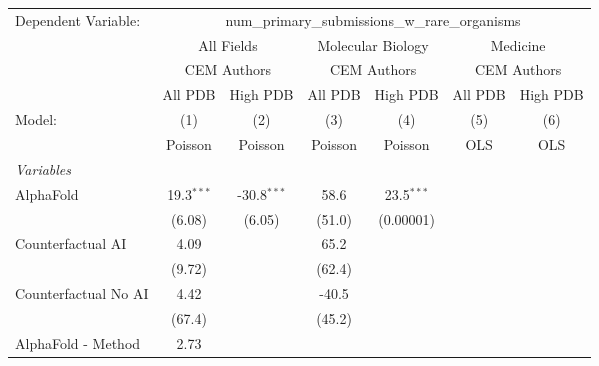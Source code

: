 \begingroup
\centering
\begin{tabular}{lcccccc}
   \tabularnewline \midrule \midrule
   Dependent Variable: & \multicolumn{6}{c}{num\_primary\_submissions\_w\_rare\_organisms}\\
 & \multicolumn{2}{c}{All Fields} & \multicolumn{2}{c}{Molecular Biology} & \multicolumn{2}{c}{Medicine} \\
\cmidrule(lr){2-3} \cmidrule(lr){4-5} \cmidrule(lr){6-7}
 & \multicolumn{2}{c}{CEM Authors} & \multicolumn{2}{c}{CEM Authors} & \multicolumn{2}{c}{CEM Authors} \\
\cmidrule(lr){2-3} \cmidrule(lr){4-5} \cmidrule(lr){6-7}
 & \multicolumn{1}{c}{All PDB} & \multicolumn{1}{c}{High PDB} & \multicolumn{1}{c}{All PDB} & \multicolumn{1}{c}{High PDB} & \multicolumn{1}{c}{All PDB} & \multicolumn{1}{c}{High PDB} \\
\cmidrule(lr){2-2} \cmidrule(lr){3-3} \cmidrule(lr){4-4} \cmidrule(lr){5-5} \cmidrule(lr){6-6} \cmidrule(lr){7-7}
   Model:                                                  & (1)          & (2)           & (3)     & (4)          & (5)  & (6)\\  
                                                           &  Poisson     & Poisson       & Poisson & Poisson      & OLS  & OLS\\  
   \midrule
   \emph{Variables}\\
   AlphaFold                                               & 19.3$^{***}$ & -30.8$^{***}$ & 58.6    & 23.5$^{***}$ &      &   \\   
                                                           & (6.08)       & (6.05)        & (51.0)  & (0.00001)    &      &   \\   
   Counterfactual AI                                       & 4.09         &               & 65.2    &              &      &   \\   
                                                           & (9.72)       &               & (62.4)  &              &      &   \\   
   Counterfactual No AI                                    & 4.42         &               & -40.5   &              &      &   \\   
                                                           & (67.4)       &               & (45.2)  &              &      &   \\   
   AlphaFold - Method                                      & 2.73         &               &         &              &      &   \\   

\end{tabular}
